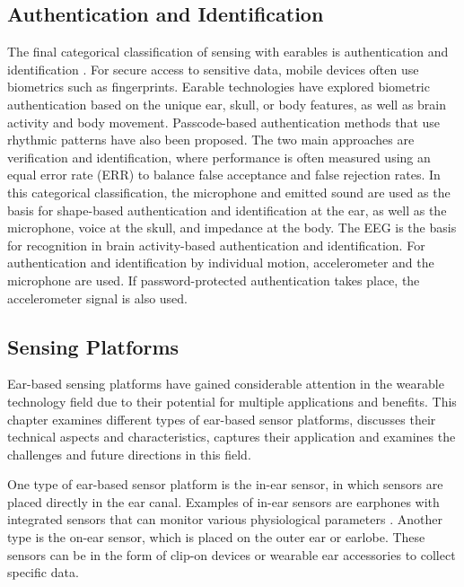 \subsection{Authentication and Identification}
\label{Background:SensingWithEarables:Authentication}
The final categorical classification of sensing with earables is authentication and identification \cite{roddigerSensingEarablesSystematic2022a}. 
For secure access to sensitive data, mobile devices often use biometrics such as fingerprints. 
Earable technologies have explored biometric authentication based on the unique ear, skull, or body features, as well as brain activity and body movement. 
Passcode-based authentication methods that use rhythmic patterns have also been proposed. 
The two main approaches are verification and identification, where performance is often measured using an equal error rate (ERR) to balance false acceptance and false rejection rates.
In this categorical classification, the microphone and emitted sound are used as the basis for shape-based authentication and identification at the ear, as well as the microphone, voice at the skull, and impedance at the body.
The EEG is the basis for recognition in brain activity-based authentication and identification.
For authentication and identification by individual motion, accelerometer and the microphone are used. 
If password-protected authentication takes place, the accelerometer signal is also used.

\subsection{Sensing Platforms}
\label{Background:SensingWithEarables:SensingPlatforms}
Ear-based sensing platforms have gained considerable attention in the wearable technology field due to their potential for multiple applications and benefits. 
This chapter examines different types of ear-based sensor platforms, discusses their technical aspects and characteristics, captures their application and examines the challenges and future directions in this field.

One type of ear-based sensor platform is the in-ear sensor, in which sensors are placed directly in the ear canal. Examples of in-ear sensors are earphones with integrated sensors that can monitor various physiological parameters \cite{maseHearablesNewPerspectives2020, bestbierDevelopmentVitalSigns2018, luekenPhotoplethysmographybasedInearSensor2017}. 
Another type is the on-ear sensor, which is placed on the outer ear or earlobe. 
These sensors can be in the form of clip-on devices or wearable ear accessories to collect specific data.

